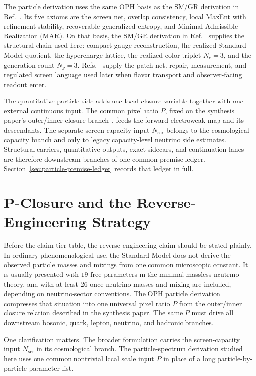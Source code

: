 \documentclass[11pt]{article}
\begin{document}
The particle derivation uses the same OPH basis as the SM/GR derivation in Ref.~\cite{ophcompact}. Its five
axioms are the screen net, overlap consistency, local MaxEnt with refinement stability,
recoverable generalized entropy, and Minimal Admissible Realization (MAR). On that basis, the
SM/GR derivation in Ref.~\cite{ophcompact} supplies the structural chain used here: compact gauge reconstruction, the realized
Standard Model quotient, the hypercharge lattice, the realized color triplet \(N_c=3\), and the generation count \(N_g=3\).
Refs.~\cite{ophconsensus,ophmicrophysics} supply the patch-net, repair, measurement, and
regulated screen language used later when flavor transport and observer-facing readout enter.

The quantitative particle side adds one local closure variable together with one external
continuous input. The common pixel ratio \(P\), fixed on the synthesis paper's outer/inner closure
branch~\cite{ophsynthesis}, feeds the forward electroweak map and its descendants. The
separate screen-capacity input \(N_{\mathrm{scr}}\) belongs to the cosmological-capacity branch and
only to legacy capacity-level neutrino side estimates. Structural carriers, quantitative outputs,
exact sidecars, and continuation lanes are therefore downstream branches of one common premise
ledger. Section~\ref{sec:particle-premise-ledger}
records that ledger in full.

\section{P-Closure and the Reverse-Engineering Strategy}

Before the claim-tier table, the reverse-engineering claim should be stated plainly. In
ordinary phenomenological use, the Standard Model does not derive the observed particle masses and
mixings from one common microscopic constant. It is usually presented with \(19\) free parameters
in the minimal massless-neutrino theory, and with at least \(26\) once neutrino masses and mixing
are included, depending on neutrino-sector conventions. The OPH particle derivation compresses
that situation into one universal pixel ratio \(P\) from the outer/inner closure relation
described in the synthesis paper. The same \(P\) must drive all
downstream bosonic, quark, lepton, neutrino, and hadronic branches.

One clarification matters. The broader formulation carries the
screen-capacity input \(N_{\mathrm{scr}}\) in its cosmological branch. The particle-spectrum derivation studied here uses one common nontrivial local scale input \(P\) in place of a long particle-by-particle parameter list.
\end{document}

